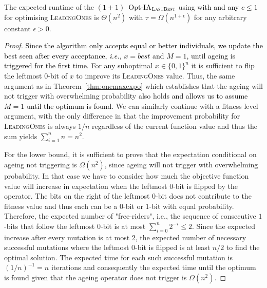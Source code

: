 \documentclass[lettersize,journal]{IEEEtran}
\newcommand{\new}[1]{\textcolor{black}{#1}}
\begin{document}
\begin{theorem} \label{thm:leadingonesexpo}
	The expected runtime of  the \new{$(1+1)$~Opt-IA$_{\textsc{LastBest}}$} using \IPHfcm{}  %
	\textcolor{black}{ with {\linHD }} \new{and any $c\leq 1$} for optimising
	\textsc{LeadingOnes} is $\Theta(n^2)$ with $\tau=\Omega(n^{1+\epsilon})$ {\color{black}for any arbitrary} 
	constant $\epsilon>0$.
\end{theorem}
\begin{proof}
	

\textcolor{black}{Since the algorithm only accepts equal or better individuals, we update the best seen after every acceptance, \emph{i.e.,} $x=best$ and $M=1$, until ageing is triggered for the first time.  }
For any suboptimal $x\in\{0,1\}^n$ it is sufficient to flip the leftmost $0$-bit of $x$ to improve its \textsc{LeadingOnes} value. Thus, the same argument as in Theorem~\ref{thm:onemaxexpo} which establishes that the ageing will not trigger with overwhelming probability also holds \textcolor{black}{and allows us to assume $M=1$ until the optimum is found}. We can similarly continue with a fitness level argument, {\color{black} with the only difference in that} the improvement probability for \textsc{LeadingOnes} is always $1/n$ regardless of the current function value and thus the sum yields $\sum\limits_{i=1}^{n}n = n^2$.

For the lower bound, it is sufficient to prove that the {\color{black}expectation conditional on ageing not triggering} is $\Omega(n^2)$, since ageing will not trigger with overwhelming probability. In that case we have to consider how much the objective function value will increase in expectation when the leftmost $0$-bit is flipped by the operator. The bits on the right of the leftmost $0$-bit does not contribute to the fitness value and thus each can be a $0$-bit or $1$-bit with equal probability. Therefore, the expected number of "free-riders", i.e., the sequence of consecutive $1$-bits that follow the leftmost $0$-bit is at most $\sum_{i=0}^{n}2^{-i}\leq 2$. Since the expected increase after every mutation is at most $2$, the expected number of necessary successful mutations where the leftmost $0$-bit is flipped is at least $n/2$ to find the optimal solution. The expected time for each such successful mutation is $(1/n)^{-1}=n$ iterations and consequently the expected time until the optimum is found given that the ageing operator does not trigger is $\Omega(n^2)$.  
	
\end{proof}
\end{document}
